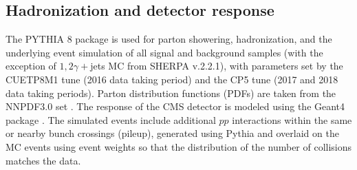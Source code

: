 \subsection{Hadronization and detector response} \label{sec:HadronizationAndDetectorResponse}

The PYTHIA 8 \cite{Sjostrand:2014zea} package is used for parton showering, hadronization, and the underlying event simulation of all signal and background samples (with the exception of $1,2\gamma+$jets MC from SHERPA v.2.2.1),
with parameters set by the CUETP8M1 tune \cite{Khachatryan:2015pea} (2016 data taking period) and the CP5 tune \cite{Sirunyan:2019dfx} (2017 and 2018 data taking periods). Parton distribution functions (PDFs) are taken from the NNPDF3.0 set \cite{Ball:2014uwa}.
The response of the CMS detector is modeled using the Geant4 package \cite{AGOSTINELLI2003250}.
The simulated events include additional $pp$ interactions within the same or nearby bunch crossings (pileup), generated using Pythia and overlaid on the MC events using event weights so that the distribution of the number of collisions matches the data.
